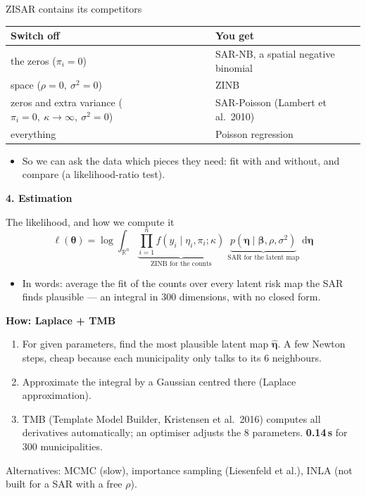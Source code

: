 \documentclass[10pt,aspectratio=169]{beamer}
\newcommand{\bbeta}{\boldsymbol{\beta}}
\newcommand{\btheta}{\boldsymbol{\theta}}
\newcommand{\sect}[1]{\begin{frame}[plain]\centering\vfill{\usebeamercolor[fg]{title}\LARGE\bfseries #1}\vfill\end{frame}}
\begin{document}
\begin{frame}{ZISAR contains its competitors}
  \centering
  \begin{tabular}{ll}
    \toprule
    Switch off & You get \\
    \midrule
    the zeros ($\pi_i=0$) & SAR-NB, a spatial negative binomial \\
    space ($\rho=0,\ \sigma^2=0$) & ZINB \\
    zeros and extra variance ($\pi_i=0,\ \kappa\to\infty,\ \sigma^2=0$) & SAR-Poisson (Lambert et al.\ 2010) \\
    everything & Poisson regression \\
    \bottomrule
  \end{tabular}
  \vspace{1.5em}
  \begin{itemize}
    \item So we can ask the data which pieces they need: fit with and without, and compare (a likelihood-ratio test).
  \end{itemize}
\end{frame}

\sect{4. Estimation}

\begin{frame}{The likelihood, and how we compute it}
  \[
    \ell(\btheta) = \log\int_{\mathbb R^n}
    \underbrace{\prod_{i=1}^n f(y_i\mid\eta_i,\pi_i;\kappa)}_{\text{ZINB for the counts}}\;
    \underbrace{p(\boldsymbol\eta\mid\bbeta,\rho,\sigma^2)}_{\text{SAR for the latent map}}\;
    \mathrm d\boldsymbol\eta
  \]
  \begin{itemize}
    \item In words: average the fit of the counts over every latent risk map the SAR finds plausible --- an integral in 300 dimensions, with no closed form.
  \end{itemize}
  \vspace{0.3em}
  \textbf{How: Laplace + TMB}
  \begin{enumerate}\setlength{\itemsep}{0.3em}
    \item For given parameters, find the most plausible latent map $\hat{\boldsymbol\eta}$. A few Newton steps, cheap because each municipality only talks to its 6 neighbours.
    \item Approximate the integral by a Gaussian centred there (Laplace approximation).
    \item TMB (Template Model Builder, Kristensen et al.\ 2016) computes all derivatives automatically; an optimiser adjusts the 8 parameters. \textbf{0.14\,s} for 300 municipalities.
  \end{enumerate}
  {\footnotesize Alternatives: MCMC (slow), importance sampling (Liesenfeld et al.), INLA (not built for a SAR with a free $\rho$).}
\end{frame}
\end{document}
